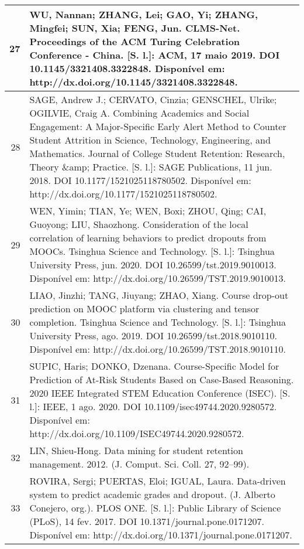 \begin{apendicesenv}
\begin{longtable}[c]{|r|l|}
27 &
  \multicolumn{1}{p{14.5cm}|}{WU, Nannan; ZHANG, Lei; GAO, Yi; ZHANG, Mingfei; SUN, Xia; FENG, Jun. CLMS-Net. Proceedings of the ACM Turing Celebration Conference - China. {[}S. l.{]}: ACM, 17 maio 2019. DOI 10.1145/3321408.3322848. Disponível em: http://dx.doi.org/10.1145/3321408.3322848.} \\ \hline
28 &
  \multicolumn{1}{p{14.5cm}|}{SAGE, Andrew J.; CERVATO, Cinzia; GENSCHEL, Ulrike; OGILVIE, Craig A. Combining Academics and Social Engagement: A Major-Specific Early Alert Method to Counter Student Attrition in Science, Technology, Engineering, and Mathematics. Journal of College Student Retention: Research, Theory \&amp; Practice. {[}S. l.{]}: SAGE Publications, 11 jun. 2018. DOI 10.1177/1521025118780502. Disponível em: http://dx.doi.org/10.1177/1521025118780502.} \\ \hline
29 &
  \multicolumn{1}{p{14.5cm}|}{WEN, Yimin; TIAN, Ye; WEN, Boxi; ZHOU, Qing; CAI, Guoyong; LIU, Shaozhong. Consideration of the local correlation of learning behaviors to predict dropouts from MOOCs. Tsinghua Science and Technology. {[}S. l.{]}: Tsinghua University Press, jun. 2020. DOI 10.26599/tst.2019.9010013. Disponível em: http://dx.doi.org/10.26599/TST.2019.9010013.} \\ \hline
30 &
  \multicolumn{1}{p{14.5cm}|}{LIAO, Jinzhi; TANG, Jiuyang; ZHAO, Xiang. Course drop-out prediction on MOOC platform via clustering and tensor completion. Tsinghua Science and Technology. {[}S. l.{]}: Tsinghua University Press, ago. 2019. DOI 10.26599/tst.2018.9010110. Disponível em: http://dx.doi.org/10.26599/TST.2018.9010110.} \\ \hline
31 &
  \multicolumn{1}{p{14.5cm}|}{SUPIC, Haris; DONKO, Dzenana. Course-Specific Model for Prediction of At-Risk Students Based on Case-Based Reasoning. 2020 IEEE Integrated STEM Education Conference (ISEC). {[}S. l.{]}: IEEE, 1 ago. 2020. DOI 10.1109/isec49744.2020.9280572. Disponível em: http://dx.doi.org/10.1109/ISEC49744.2020.9280572.} \\ \hline
32 &
  \multicolumn{1}{p{14.5cm}|}{LIN, Shieu-Hong. Data mining for student retention management. 2012. (J. Comput. Sci. Coll. 27, 92–99).} \\ \hline
33 &
  \multicolumn{1}{p{14.5cm}|}{ROVIRA, Sergi; PUERTAS, Eloi; IGUAL, Laura. Data-driven system to predict academic grades and dropout. (J. Alberto Conejero, org.). PLOS ONE. {[}S. l.{]}: Public Library of Science (PLoS), 14 fev. 2017. DOI 10.1371/journal.pone.0171207. Disponível em: http://dx.doi.org/10.1371/journal.pone.0171207.} \\ \hline

\end{longtable}
\end{apendicesenv}
